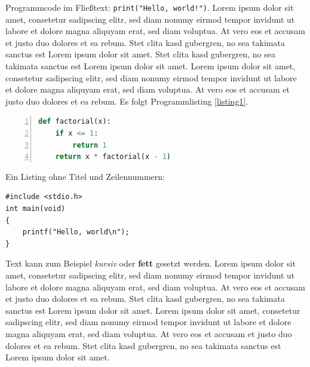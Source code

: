 \documentclass[a4paper, twoside]{IEEEtran}
\begin{document}
Programmcode im Fließtext: \lstinline{print("Hello, world!")}.
Lorem ipsum dolor sit amet, consetetur sadipscing elitr, sed diam nonumy eirmod tempor invidunt ut labore et dolore magna aliquyam erat, sed diam voluptua. At vero eos et accusam et justo duo dolores et ea rebum. Stet clita kasd gubergren, no sea takimata sanctus est Lorem ipsum dolor sit amet. Stet clita kasd gubergren, no sea takimata sanctus est Lorem ipsum dolor sit amet. Lorem ipsum dolor sit amet, consetetur sadipscing elitr, sed diam nonumy eirmod tempor invidunt ut labore et dolore magna aliquyam erat, sed diam voluptua. At vero eos et accusam et justo duo dolores et ea rebum.
Es folgt Programmlisting \ref{listing1}.

\begin{lstlisting}[caption={Beschreibung des Listings.}, language=Python, label=listing1, numbers=left, xleftmargin=6mm]
def factorial(x):
    if x <= 1:
        return 1
    return x * factorial(x - 1)
\end{lstlisting}
Ein Listing ohne Titel und Zeilennummern:

\begin{lstlisting}
#include <stdio.h>
int main(void)
{
    printf("Hello, world\n");
}
\end{lstlisting}
Text kann zum Beispiel \emph{kursiv} oder \textbf{fett} gesetzt werden.
Lorem ipsum dolor sit amet, consetetur sadipscing elitr, sed diam nonumy eirmod tempor invidunt ut labore et dolore magna aliquyam erat, sed diam voluptua. At vero eos et accusam et justo duo dolores et ea rebum. Stet clita kasd gubergren, no sea takimata sanctus est Lorem ipsum dolor sit amet. Lorem ipsum dolor sit amet, consetetur sadipscing elitr, sed diam nonumy eirmod tempor invidunt ut labore et dolore magna aliquyam erat, sed diam voluptua. At vero eos et accusam et justo duo dolores et ea rebum. Stet clita kasd gubergren, no sea takimata sanctus est Lorem ipsum dolor sit amet.



\printbibliography
\end{document}
